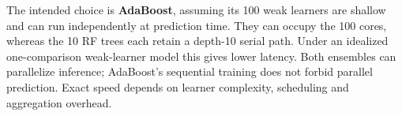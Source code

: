 The intended choice is \textbf{AdaBoost}, assuming its 100 weak learners are shallow and can run independently at prediction time. They can occupy the 100 cores, whereas the 10 RF trees each retain a depth-10 serial path. Under an idealized one-comparison weak-learner model this gives lower latency. Both ensembles can parallelize inference; AdaBoost's sequential training does not forbid parallel prediction. Exact speed depends on learner complexity, scheduling and aggregation overhead.
